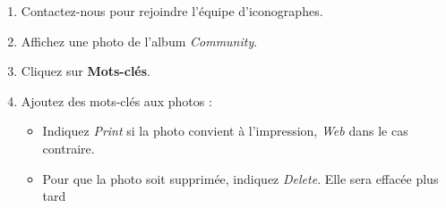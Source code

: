 \documentclass[12pt,nofoldmark,notumble]{leaflet}
\begin{document}
\vspace*{\fill}

\begin{enumerate}[itemsep=0mm,leftmargin=*]

\item Contactez-nous pour rejoindre l'équipe d'iconographes.
\item Affichez une photo de l'album \emph{Community}.
\item Cliquez sur \faPencil \textbf{Mots-clés}.
\item Ajoutez des mots-clés aux photos :

  \begin{itemize}
  \item Indiquez \emph{Print} si la photo convient à l'impression, \emph{Web}
    dans le cas contraire.

  \item Pour que la photo soit supprimée, indiquez \emph{Delete}.  Elle sera
    effacée plus tard

  \end{itemize}
\end{enumerate}
  
\begin{center}
  \setlength{\fboxsep}{0pt}%
  \setlength{\fboxrule}{0pt}%
\end{center}

\vspace*{\fill}
\end{document}
